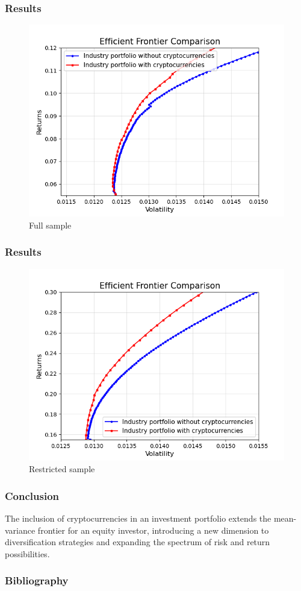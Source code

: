 \documentclass{beamer}
\begin{document}
\begin{frame}
\frametitle{Results}
\begin{figure}
    \centering
    \includegraphics[width=0.8\linewidth]{Figures/Efficient_Frontier_Comparison_Full_Sample.png}
    \caption{Full sample}
    \label{fig:full}
\end{figure}
\end{frame}

\begin{frame}
\frametitle{Results}
\begin{figure}
    \centering
    \includegraphics[width=0.8\linewidth]{Figures/Efficient_Frontier_Comparison_Bull_Market.png}
    \caption{Restricted sample}
    \label{fig:restricted}
\end{figure}
\end{frame}

\begin{frame}
\frametitle{Conclusion}
The inclusion of cryptocurrencies in an investment portfolio extends the mean-variance frontier for an equity investor, 
introducing a new dimension to diversification strategies and expanding the spectrum of risk and return possibilities. 
\nocite{wikiref}
\end{frame}

\begin{frame}
\frametitle{Bibliography}


\end{frame}
\end{document}
